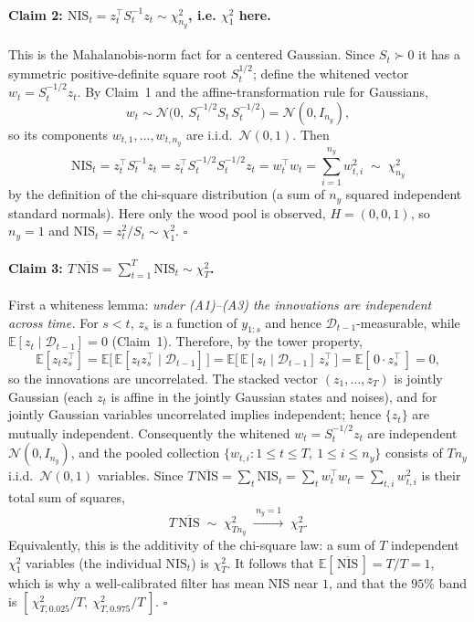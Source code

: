 \documentclass{article}
\newcommand{\E}{\mathbb{E}}
\newcommand{\Norm}{\mathcal{N}}
\begin{document}
\paragraph{Claim 2: $\mathrm{NIS}_t = z_t^\top S_t^{-1} z_t \sim \chi^2_{n_y}$, i.e.
$\chi^2_1$ here.}
This is the Mahalanobis-norm fact for a centered Gaussian. Since $S_t \succ 0$ it has a
symmetric positive-definite square root $S_t^{1/2}$; define the whitened vector
$w_t = S_t^{-1/2} z_t$. By Claim~1 and the affine-transformation rule for Gaussians,
\[
  w_t \sim \Norm\!\big(0,\ S_t^{-1/2} S_t\, S_t^{-1/2}\big) = \Norm(0, I_{n_y}),
\]
so its components $w_{t,1},\dots,w_{t,n_y}$ are i.i.d.\ $\Norm(0,1)$. Then
\[
  \mathrm{NIS}_t = z_t^\top S_t^{-1} z_t
  = z_t^\top S_t^{-1/2} S_t^{-1/2} z_t = w_t^\top w_t = \sum_{i=1}^{n_y} w_{t,i}^2
  \;\sim\; \chi^2_{n_y}
\]
by the definition of the chi-square distribution (a sum of $n_y$ squared independent
standard normals). Here only the wood pool is observed, $H=(0,0,1)$, so $n_y=1$ and
$\mathrm{NIS}_t = z_t^2/S_t \sim \chi^2_1$. \hfill$\square$

\paragraph{Claim 3: $T\,\overline{\mathrm{NIS}} = \sum_{t=1}^T \mathrm{NIS}_t \sim \chi^2_T$.}
First a whiteness lemma: \emph{under (A1)--(A3) the innovations are independent across time.}
For $s < t$, $z_s$ is a function of $y_{1:s}$ and hence
$\mathcal{D}_{t-1}$-measurable, while $\E[z_t \mid \mathcal{D}_{t-1}] = 0$ (Claim~1).
Therefore, by the tower property,
\[
  \E[z_t z_s^\top]
  = \E\!\big[\,\E[z_t z_s^\top \mid \mathcal{D}_{t-1}]\,\big]
  = \E\!\big[\,\E[z_t \mid \mathcal{D}_{t-1}]\, z_s^\top\,\big]
  = \E[\,0\cdot z_s^\top\,] = 0,
\]
so the innovations are uncorrelated. The stacked vector $(z_1,\dots,z_T)$ is jointly
Gaussian (each $z_t$ is affine in the jointly Gaussian states and noises), and for jointly
Gaussian variables uncorrelated implies independent; hence $\{z_t\}$ are mutually
independent. Consequently the whitened $w_t = S_t^{-1/2} z_t$ are independent
$\Norm(0, I_{n_y})$, and the pooled collection $\{w_{t,i} : 1\le t\le T,\ 1\le i\le n_y\}$
consists of $T n_y$ i.i.d.\ $\Norm(0,1)$ variables. Since $T\,\overline{\mathrm{NIS}} = \sum_t
\mathrm{NIS}_t = \sum_t w_t^\top w_t = \sum_{t,i} w_{t,i}^2$ is their total sum of squares,
\[
  T\,\overline{\mathrm{NIS}} \;\sim\; \chi^2_{T n_y}
  \;\xrightarrow{\ n_y = 1\ }\; \chi^2_T .
\]
Equivalently, this is the additivity of the chi-square law: a sum of $T$ independent
$\chi^2_1$ variables (the individual $\mathrm{NIS}_t$) is $\chi^2_T$. It follows that
$\E[\,\overline{\mathrm{NIS}}\,] = T/T = 1$, which is why a well-calibrated filter has mean
NIS near $1$, and that the $95\%$ band is $[\,\chi^2_{T,0.025}/T,\ \chi^2_{T,0.975}/T\,]$.
\hfill$\square$
\end{document}
